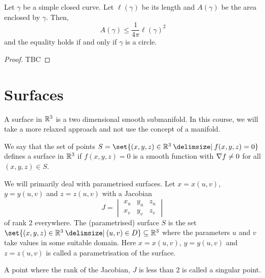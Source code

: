 \documentclass[11pt]{penrose}
\newcommand{\keyword}[1]{\textsf{#1}}
\begin{document}
\begin{nthm}
    Let $\gamma$ be a simple closed curve. Let $\ell(\gamma)$ be its length and $A(\gamma)$ be the area enclosed by $\gamma$. Then,
    \begin{equation}
        A(\gamma) \leq \frac{1}{4\pi} \ell(\gamma)^2
    \end{equation}
    and the equality holds if and only if $\gamma$ is a circle.
\end{nthm}
\begin{proof}
    TBC
\end{proof}

\section{Surfaces}
A \keyword{surface} in $\mathbb{R}^3$ is a two dimensional smooth submanifold. In this course, we will take a more relaxed approach and not use the concept of a manifold.

We say that the set of points $S = \set{(x,y,z) \in \R^3 \st f(x,y,z) = 0}$ defines a surface in $\mathbb{R}^3$ if $f(x,y,z) = 0$ is a smooth function with $\nabla f \neq 0$ for all $(x,y,z) \in S$.

We will primarily deal with parametrised surfaces. Let $x = x(u,v)$, $y = y(u,v)$ and $z = z(u,v)$ with a \keyword{Jacobian}
\begin{equation}
    J = \begin{vmatrix} x_u & y_u & z_u\\ x_v & y_v & z_v \end{vmatrix}
\end{equation}
of rank $2$ everywhere. The (parametrised) surface $S$ is the set $\set{(x,y,z) \in \R^3 \st (u,v) \in D} \subseteq \R^3$ where the parameters $u$ and $v$ take values in some suitable domain. Here $x = x(u,v)$, $y = y(u,v)$ and $z = z(u,v)$ is called a parametrisation of the surface.

A point where the rank of the Jacobian, $J$ is less than $2$ is called a \keyword{singular point}.
\end{document}
